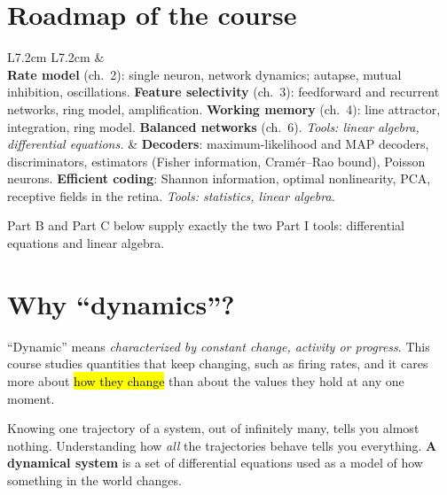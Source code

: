 \section{Roadmap of the course}

\begin{center}
\renewcommand{\arraystretch}{1.2}
\begin{tabular}{L{7.2cm} L{7.2cm}}
 & \\
\textbf{Rate model} (ch.\ 2): single neuron, network dynamics; autapse, mutual inhibition, oscillations.\newline
\textbf{Feature selectivity} (ch.\ 3): feedforward and recurrent networks, ring model, amplification.\newline
\textbf{Working memory} (ch.\ 4): line attractor, integration, ring model.\newline
\textbf{Balanced networks} (ch.\ 6).\newline
\emph{Tools: linear algebra, differential equations.}
&
\textbf{Decoders}: maximum-likelihood and MAP decoders, discriminators, estimators (Fisher information, Cram\'er--Rao bound), Poisson neurons.\newline
\textbf{Efficient coding}: Shannon information, optimal nonlinearity, PCA, receptive fields in the retina.\newline
\emph{Tools: statistics, linear algebra.}
\end{tabular}
\end{center}
Part B and Part C below supply exactly the two Part I tools: differential equations and linear algebra.


\section{Why ``dynamics''?}

``Dynamic'' means \emph{characterized by constant change, activity or progress}. This course studies quantities that
keep changing, such as firing rates, and it cares more about \hl{how they change} than about the values they hold at any one moment.

\begin{intuition}
Knowing one trajectory of a system, out of infinitely many, tells you almost nothing. Understanding how \emph{all} the
trajectories behave tells you everything. \textbf{A dynamical system} is a set of differential equations used as a model of how something in the world changes.
\end{intuition}

